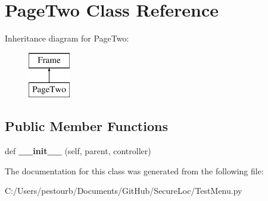 \hypertarget{class_test_menu_1_1_page_two}{}\section{Page\+Two Class Reference}
\label{class_test_menu_1_1_page_two}
Inheritance diagram for Page\+Two\+:\begin{figure}[H]
\begin{center}
\leavevmode
\includegraphics[height=2.000000cm]{class_test_menu_1_1_page_two}
\end{center}
\end{figure}
\subsection*{Public Member Functions}
\begin{DoxyCompactItemize}
\item 
\mbox{\label{class_test_menu_1_1_page_two_a558d9afc290e8d1ff922f46114f16631}} 
def {\bfseries \+\_\+\+\_\+init\+\_\+\+\_\+} (self, parent, controller)
\end{DoxyCompactItemize}


The documentation for this class was generated from the following file\+:\begin{DoxyCompactItemize}
\item 
C\+:/\+Users/pestourb/\+Documents/\+Git\+Hub/\+Secure\+Loc/Test\+Menu.\+py\end{DoxyCompactItemize}
